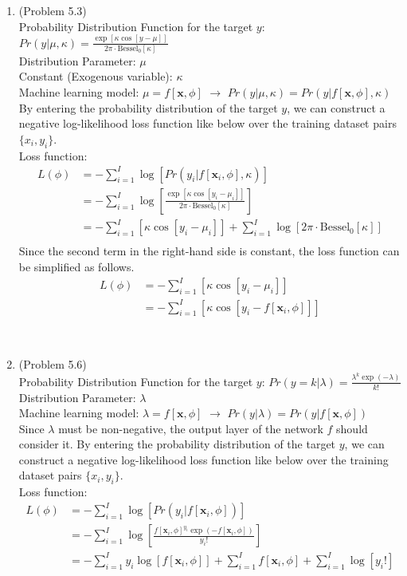 \documentclass[10pt]{article}
\begin{document}
\begin{enumerate}
\item (Problem 5.3) \\
	Probability Distribution Function for the target $y$: $Pr(y|\mu, \kappa)=\frac{\exp[\kappa\cos[y-\mu]]}{2\pi\cdot \text{Bessel}_0[\kappa]}$ \\
	Distribution Parameter: $\mu$ \\
	Constant (Exogenous variable): $\kappa$ \\
	Machine learning model: $\mu=f[\textbf{x}, \phi]$ $\rightarrow$ $Pr(y|\mu, \kappa)=Pr(y|f[\textbf{x}, \phi], \kappa)$ \\
	By entering the probability distribution of the target $y$, we can construct a negative log-likelihood loss function like below over the training dataset pairs $\{x_i, y_i\}$. \\
	Loss function:
	\begin{align*}
	L(\phi) &= -\sum_{i=1}^I \log[Pr(y_i|f[\textbf{x}_i, \phi], \kappa)] \\
	&= -\sum_{i=1}^I \log[\frac{\exp[\kappa\cos[y_i-\mu_i]]}{2\pi\cdot \text{Bessel}_0[\kappa]}] \\
	&= -\sum_{i=1}^I [\kappa\cos[y_i-\mu_i]]+\sum_{i=1}^I \log[2\pi\cdot \text{Bessel}_0[\kappa]] \\
	\end{align*}
	Since the second term in the right-hand side is constant, the loss function can be simplified as follows.
	\begin{align*}
	L(\phi) &= -\sum_{i=1}^I [\kappa\cos[y_i-\mu_i]] \\
	&= -\sum_{i=1}^I [\kappa\cos[y_i-f[\textbf{x}_i, \phi]]]
	\end{align*}

\
	
\item (Problem 5.6) \\
	Probability Distribution Function for the target $y$: $Pr(y=k|\lambda)=\frac{\lambda^k \exp(-\lambda)}{k!}$ \\
	Distribution Parameter: $\lambda$ \\
	Machine learning model: $\lambda=f[\textbf{x}, \phi]$ $\rightarrow$ $Pr(y|\lambda)=Pr(y|f[\textbf{x}, \phi])$ \\
	Since $\lambda$ must be non-negative, the output layer of the network $f$ should consider it. By entering the probability distribution of the target $y$, we can construct a negative log-likelihood loss function like below over the training dataset pairs $\{x_i, y_i\}$. \\
	Loss function:
	\begin{align*}
	L(\phi) &= -\sum_{i=1}^I \log[Pr(y_i|f[\textbf{x}_i, \phi])] \\
	&= -\sum_{i=1}^I \log[\frac{f[\textbf{x}_i, \phi]^{y_i} \exp(-f[\textbf{x}_i, \phi])}{y_i!}] \\
	&= -\sum_{i=1}^I y_i \log[f[\textbf{x}_i, \phi]]+\sum_{i=1}^I f[\textbf{x}_i, \phi]+\sum_{i=1}^I \log[y_i!]
	\end{align*}


\end{enumerate}
\end{document}
